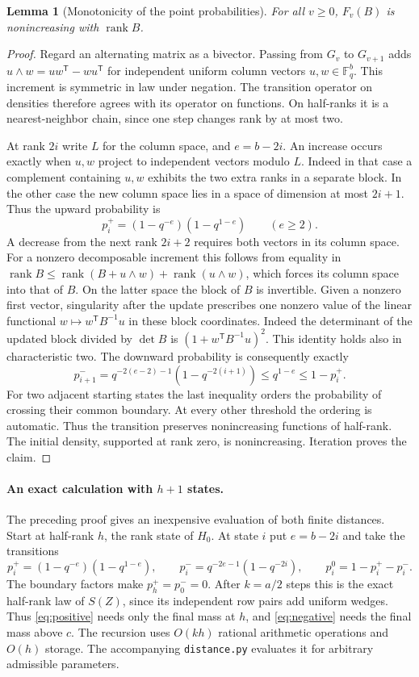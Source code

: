 \documentclass[11pt]{article}
\newtheorem{lemma}[theorem]{Lemma}
\newcommand{\F}{\mathbb F_q}
\newcommand{\rk}{\operatorname{rank}}
\newcommand{\T}{\mathsf T}
\begin{document}
\begin{lemma}[Monotonicity of the point probabilities]\label{lem:mono}
For all $v\ge0$, $F_v(B)$ is nonincreasing with $\rk B$.
\end{lemma}
\begin{proof}
Regard an alternating matrix as a bivector. Passing from $G_v$ to $G_{v+1}$ adds $u\wedge w=uw^\T-wu^\T$ for independent uniform column vectors $u,w\in\F^b$. This increment is symmetric in law under negation. The transition operator on densities therefore agrees with its operator on functions. On half-ranks it is a nearest-neighbor chain, since one step changes rank by at most two.

At rank $2i$ write $L$ for the column space, and $e=b-2i$. An increase occurs exactly when $u,w$ project to independent vectors modulo $L$. Indeed in that case a complement containing $u,w$ exhibits the two extra ranks in a separate block. In the other case the new column space lies in a space of dimension at most $2i+1$. Thus the upward probability is
\[
 p_i^+=(1-q^{-e})(1-q^{1-e})\qquad(e\ge2).
\]
A decrease from the next rank $2i+2$ requires both vectors in its column space. For a nonzero decomposable increment this follows from equality in
$\rk B\le\rk(B+u\wedge w)+\rk(u\wedge w)$, which forces its column space into that of $B$. On the latter space the block of $B$ is invertible. Given a nonzero first vector, singularity after the update prescribes one nonzero value of the linear functional $w\mapsto w^\T B^{-1}u$ in these block coordinates. Indeed the determinant of the updated block divided by $\det B$ is $(1+w^\T B^{-1}u)^2$. This identity holds also in characteristic two. The downward probability is consequently exactly
\[
 p_{i+1}^-=q^{-2(e-2)-1}(1-q^{-2(i+1)})\le q^{1-e}\le 1-p_i^+.
\]
For two adjacent starting states the last inequality orders the probability of crossing their common boundary. At every other threshold the ordering is automatic. Thus the transition preserves nonincreasing functions of half-rank. The initial density, supported at rank zero, is nonincreasing. Iteration proves the claim.
\end{proof}

\paragraph{An exact calculation with $h+1$ states.}
The preceding proof gives an inexpensive evaluation of both finite distances. Start at half-rank $h$, the rank state of $H_0$. At state $i$ put $e=b-2i$ and take the transitions
\[
 p_i^+=(1-q^{-e})(1-q^{1-e}),\qquad
 p_i^-=q^{-2e-1}(1-q^{-2i}),\qquad
 p_i^0=1-p_i^+-p_i^- .
\]
The boundary factors make $p_h^+=p_0^-=0$. After $k=a/2$ steps this is the exact half-rank law of $S(Z)$, since its independent row pairs add uniform wedges. Thus \eqref{eq:positive} needs only the final mass at $h$, and \eqref{eq:negative} needs the final mass above $c$. The recursion uses $O(kh)$ rational arithmetic operations and $O(h)$ storage. The accompanying \texttt{distance.py} evaluates it for arbitrary admissible parameters.
\end{document}
